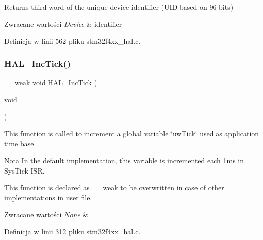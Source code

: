 Returns third word of the unique device identifier (U\+ID based on 96 bits) 


\begin{DoxyRetVals}{Zwracane wartości}
{\em Device} & identifier \\
\hline
\end{DoxyRetVals}


Definicja w linii 562 pliku stm32f4xx\+\_\+hal.\+c.

\mbox{\label{group___h_a_l___exported___functions___group2_gaba5b726bfedd013bf7bb5a51d5c4f188}} 
\subsubsection{\texorpdfstring{H\+A\+L\+\_\+\+Inc\+Tick()}{HAL\_IncTick()}}
{\footnotesize\ttfamily \+\_\+\+\_\+weak void H\+A\+L\+\_\+\+Inc\+Tick (\begin{DoxyParamCaption}\item[{void}]{ }\end{DoxyParamCaption})}



This function is called to increment a global variable \char`\"{}uw\+Tick\char`\"{} used as application time base. 

\begin{DoxyNote}{Nota}
In the default implementation, this variable is incremented each 1ms in Sys\+Tick I\+SR. 

This function is declared as \+\_\+\+\_\+weak to be overwritten in case of other implementations in user file. 
\end{DoxyNote}

\begin{DoxyRetVals}{Zwracane wartości}
{\em None} & \\
\hline
\end{DoxyRetVals}


Definicja w linii 312 pliku stm32f4xx\+\_\+hal.\+c.

\mbox{\label{group___h_a_l___exported___functions___group2_gac3fa17aa85e357e3f1af56ad110d2e97}} 

